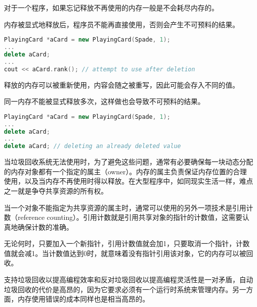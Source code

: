 \begin{compactitem}
\item 对于一个程序，如果忘记释放不再使用的内存一般是不会耗尽内存的。


\item 内存被显式地释放后，程序员不能再直接使用，否则会产生不可预料的结果。


\begin{lstlisting}[language=C++]
PlayingCard *aCard = new PlayingCard(Spade, 1);
...
delete aCard;
...
cout << aCard.rank(); // attempt to use after deletion
\end{lstlisting}

\item 释放的内存可以被重新使用，内容会随之被重写，因此可能会存入不同的值。

\item 同一内存不能被显式释放多次，这样做也会导致不可预料的结果。

\begin{lstlisting}[language=C++]
PlayingCard *aCard = new PlayingCard(Spade, 1);
...
delete aCard;
...
delete aCard; // deleting an already deleted value
\end{lstlisting}

\end{compactitem}

当垃圾回收系统无法使用时，为了避免这些问题，通常有必要确保每一块动态分配的内存对象都有一个指定的属主（owner）。内存的属主负责保证内存位置的合理使用，以及当内存不再使用时得以释放。在大型程序中，如同现实生活一样，难点之一就是争夺共享资源的所有权。

当一个对象不能指定为共享资源的属主时，通常可以使用的另外一项技术是引用计数（reference counting）。引用计数就是引用共享对象的指针的计数值，这需要认真地确保计数的准确。

无论何时，只要加入一个新指针，引用计数值就会加1，只要取消一个指针，计数值就会减1。当计数值达到0时，就意味着没有指针引用该对象，它的内存可以被回收。

支持垃圾回收以提高编程效率和反对垃圾回收以提高编程灵活性是一对矛盾，自动垃圾回收的代价是高昂的，因为它要求必须有一个运行时系统来管理内存。另一方面，内存使用错误的成本同样也是相当高昂的。


\begin{lstlisting}[language=Java]

\end{lstlisting}





\begin{lstlisting}[language=Java]

\end{lstlisting}





